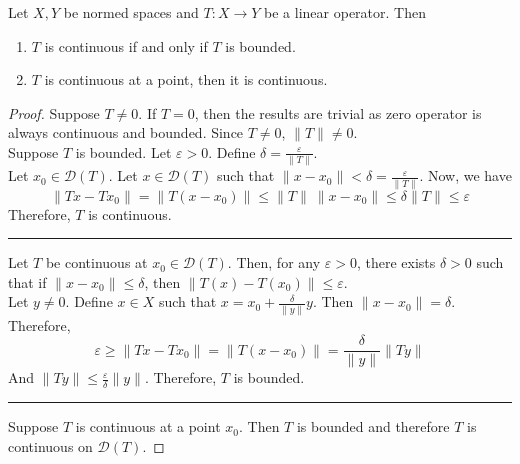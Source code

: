 \begin{theorem}
	Let $X,Y$ be normed spaces and $T : X \to Y$ be a linear operator.
	Then
	\begin{enumerate}
		\item $T$ is continuous if and only if $T$ is bounded.
		\item $T$ is continuous at a point, then it is continuous.
	\end{enumerate}
\end{theorem}
\begin{proof}
	Suppose $T \ne 0$.
	If $T = 0$, then the results are trivial as zero operator is always continuous and bounded.
	Since $T \ne 0$, $\|T\| \ne 0$.\\

	Suppose $T$ is bounded.
	Let $\varepsilon > 0$.
	Define $\delta = \frac{\varepsilon}{\|T\|}$.\\
	Let $x_0 \in \mathscr{D}(T)$.
	Let $x \in \mathscr{D}(T)$ such that $\| x - x_0 \| < \delta = \frac{\varepsilon}{\|T\|}$.
	Now, we have
	\[ \| Tx - Tx_0 \| = \| T(x-x_0) \| \le \|T\| \ \|x-x_0\| \le \delta \|T\| \le \varepsilon \]
	Therefore, $T$ is continuous. \\

	\hrule \vspace{1em}

	Let $T$ be continuous at $x_0 \in \mathscr{D}(T)$.
	Then, for any $\varepsilon > 0$, there exists $\delta > 0$ such that if $\|x-x_0\| \le \delta$, then $\|T(x) - T(x_0)\| \le \varepsilon$.\\

	Let $y \ne 0$.
	Define $x \in X$ such that $x = x_0 + \frac{\delta}{\|y\|}y$.
	Then $\| x-x_0 \| = \delta $.
	Therefore,
	\[ \varepsilon \ge \|Tx - Tx_0\| = \| T(x-x_0) \| = \frac{\delta}{\|y\|} \|Ty\| \]
	And $\|Ty\| \le \frac{\varepsilon}{\delta} \|y\|$.
	Therefore, $T$ is bounded.\\

	\hrule \vspace{1em}

	Suppose $T$ is continuous at a point $x_0$.
	Then $T$ is bounded and therefore $T$ is continuous on $\mathscr{D}(T)$.
\end{proof}

